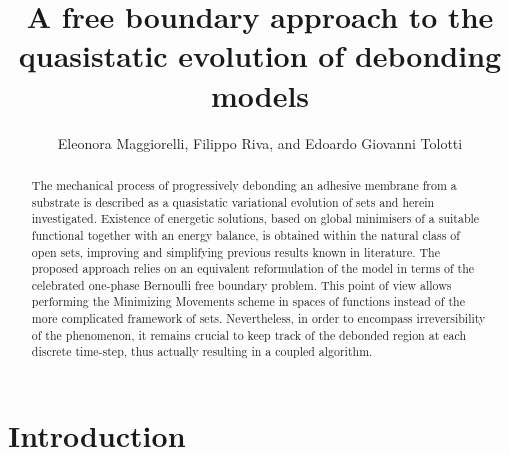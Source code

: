 \documentclass[a4paper,11pt,reqno]{amsart}
\title[A free boundary approach to quasistatic debonding]{A free boundary approach to the quasistatic evolution of debonding models}
\author[E. Maggiorelli, F. Riva, E. G. Tolotti]{Eleonora Maggiorelli\hspace{.5mm}\orcidlink{0009-0009-7986-2087}, Filippo Riva\hspace{.5mm}\orcidlink{0000-0002-7855-1262}, and Edoardo Giovanni Tolotti\hspace{.5mm}\orcidlink{0009-0004-3279-245X}}
\numberwithin{equation}{section}
\theoremstyle{definition}
\theoremstyle{remark}
\begin{document}
\begin{abstract}
		The mechanical process of progressively debonding an adhesive membrane from a substrate is described as a quasistatic variational evolution of sets and herein investigated. Existence of energetic solutions, based on global minimisers of a suitable functional together with an energy balance, is obtained within the natural class of open sets, improving and simplifying previous results known in literature. The proposed approach relies on an equivalent reformulation of the model in terms of the celebrated one-phase Bernoulli free boundary problem. This point of view allows performing the Minimizing Movements scheme in spaces of functions instead of the more complicated framework of sets. Nevertheless, in order to encompass irreversibility of the phenomenon, it remains crucial to keep track of the debonded region at each discrete time-step, thus actually resulting in a coupled algorithm.
	\end{abstract}
	
	\maketitle
	
	{\small
		\par
	}
	
	
	
	\medskip
	
	\tableofcontents
	
\renewcommand{\theequation}{I.\arabic{equation}}
\section*{Introduction}
\end{document}
